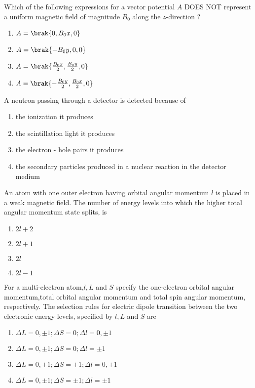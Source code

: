 \item Which of the following expressions for a vector potential $A$ DOES NOT represent a uniform magnetic field of magnitude $B_0$ along the $z$-direction ?
	\begin{enumerate}
		\item $A=\brak{0,B_0x,0}$ 
		\item $A=\brak{-B_0y,0,0}$ 
		\item $A=\brak{\frac{B_0x}{2},\frac{B_0y}{2},0}$ 
		\item $A=\brak{-\frac{B_0y}{2},\frac{B_0x}{2},0}$ 
	\end{enumerate}
\item A neutron passing through a detector is detected because of
	\begin{enumerate}
\item the ionization it produces
\item the scintillation light it produces
\item the electron - hole pairs it produces 
\item the secondary particles produced in a nuclear reaction in the detector medium 
	\end{enumerate}
\item An atom with one outer electron having orbital angular momentum $l$ is placed in a weak magnetic field. The number of energy levels into which the higher total angular momentum state splits, is
	\begin{enumerate}
		\item $2l+2$
		\item $2l+1$
		\item $2l$
		\item $2l-1$
	\end{enumerate}
\item For a multi-electron atom,$l,L$ and $S$ specify the one-electron orbital angular momentum,total orbital angular momentum and total spin angular momentum, respectively. The selection rules for electric dipole transition between the two electronic energy levels, specified by $l,L$ and $S$ are
	\begin{enumerate}
\item $\Delta L=0,\pm1;\Delta S=0;\Delta l=0,\pm1$
\item $\Delta L=0,\pm1;\Delta S=0;\Delta l=\pm1$
\item $\Delta L=0,\pm1;\Delta S=\pm1;\Delta l=0,\pm1$
\item $\Delta L=0,\pm1;\Delta S=\pm1;\Delta l=\pm1$
	\end{enumerate}
